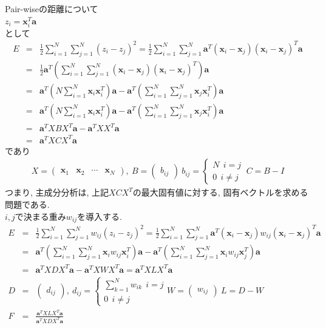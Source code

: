 \documentclass[dvipdfmx,a4j]{jsarticle}
\begin{document}
  Pair-wiseの距離について\\
  $z_{i}=\bm{x}_{i}^{T}\bm{a}$\\
  として
  \begin{eqnarray*}
    E&=&\frac{1}{2}\sum_{i=1}^{N}\sum_{j=1}^{N}(z_{i}-z_{j})^{2}=\frac{1}{2}\sum_{i=1}^{N}\sum_{j=1}^{N}\bm{a}^{T}(\bm{x}_{i}-\bm{x}_{j})(\bm{x}_{i}-\bm{x}_{j})^{T}\bm{a}\\
     &=&\frac{1}{2}\bm{a}^{T}\left(\sum_{i=1}^{N}\sum_{j=1}^{N}(\bm{x}_{i}-\bm{x}_{j})(\bm{x}_{i}-\bm{x}_{j})^{T}\right)\bm{a}\\
     &=&\bm{a}^{T}\left(N\sum_{i=1}^{N}\bm{x}_{i}\bm{x}_{i}^{T}\right)\bm{a}-\bm{a}^{T}\left(\sum_{i=1}^{N}\sum_{j=1}^{N}\bm{x}_{j}\bm{x}_{i}^{T}\right)\bm{a}\\
     &=&\bm{a}^{T}\left(N\sum_{i=1}^{N}\bm{x}_{i}\bm{x}_{i}^{T}\right)\bm{a}-\bm{a}^{T}\left(\sum_{i=1}^{N}\sum_{j=1}^{N}\bm{x}_{j}\bm{x}_{i}^{T}\right)\bm{a}\\
     &=&\bm{a}^{T}XBX^{T}\bm{a}-\bm{a}^{T}XX^{T}\bm{a}\\
     &=&\bm{a}^{T}XCX^{T}\bm{a}
  \end{eqnarray*}
  であり
  \begin{eqnarray*}
    X=\begin{pmatrix} \bm{x}_{1}&\bm{x}_{2}&\cdots&\bm{x}_{N}\end{pmatrix},\ B=\begin{pmatrix}b_{ij}\end{pmatrix}\ b_{ij}=\left\{ \begin{array}{l} N\ \ i=j\\ 0\ \ i\neq j \end{array} \right. \ C=B-I
  \end{eqnarray*}
  つまり, 主成分分析は, 上記$XCX^{T}$の最大固有値に対する, 固有ベクトルを求める問題である.\\[1cm]
  $i,j$で決まる重み$w_{ij}$を導入する.
  \begin{eqnarray*}
    E&=&\frac{1}{2}\sum_{i=1}^{N}\sum_{j=1}^{N}w_{ij}(z_{i}-z_{j})^{2}=\frac{1}{2}\sum_{i=1}^{N}\sum_{j=1}^{N}\bm{a}^{T}(\bm{x}_{i}-\bm{x}_{j})w_{ij}(\bm{x}_{i}-\bm{x}_{j})^{T}\bm{a}\\
     &=&\bm{a}^{T}\left(\sum_{i=1}^{N}\sum_{j=1}^{N}\bm{x}_{i}w_{ij}\bm{x}_{i}^{T}\right)\bm{a}-\bm{a}^{T}\left(\sum_{i=1}^{N}\sum_{j=1}^{N}\bm{x}_{i}w_{ij}\bm{x}_{j}^{T}\right)\bm{a}\\
     &=&\bm{a}^{T}XDX^{T}\bm{a}-\bm{a}^{T}XWX^{T}\bm{a}=\bm{a}^{T}XLX^{T}\bm{a}\\
    D&=&\begin{pmatrix}d_{ij}\end{pmatrix},\ d_{ij}=\left\{ \begin{array}{l} \displaystyle \sum_{k=1}^{N}w_{ik}\ \ i=j\\ 0\ \ i\neq j \end{array} \right. W=\begin{pmatrix}w_{ij} \end{pmatrix} \ L=D-W\\
    F&=&\frac{\bm{a}^{T}XLX^{T}\bm{a}}{\bm{a}^{T}XDX^{T}\bm{a}}
  \end{eqnarray*}
\end{document}
